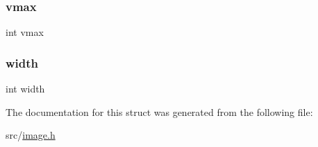 \mbox{\label{struct_image_aeb4eb9ad2dc148d828a7f6e270aa0f09}} 
\subsubsection{\texorpdfstring{vmax}{vmax}}
{\footnotesize\ttfamily int vmax}

\mbox{\label{struct_image_a2474a5474cbff19523a51eb1de01cda4}} 
\subsubsection{\texorpdfstring{width}{width}}
{\footnotesize\ttfamily int width}



The documentation for this struct was generated from the following file\+:\begin{DoxyCompactItemize}
\item 
src/\mbox{\hyperlink{image_8h}{image.\+h}}\end{DoxyCompactItemize}
